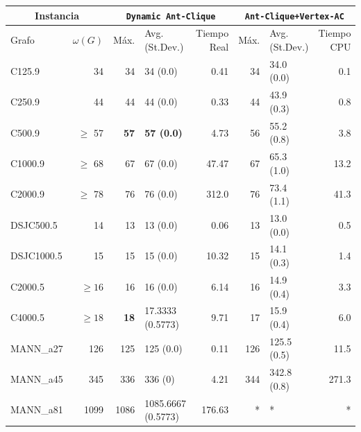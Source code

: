 \documentclass[conference]{IEEEtran}
\begin{document}
\begin{center}
\begin{table}[ht]
{\small
\hfill{}
\begin{tabular}{lr|rlr|rlr}
\hline
\multicolumn{2}{c}{Instancia} &
\multicolumn{3}{|c|}{\texttt{Dynamic Ant-Clique}} &
\multicolumn{3}{c}{\texttt{Ant-Clique+Vertex-AC}}\\
\hline
 Grafo             &  $\omega(G)$  &         Máx.  &  Avg.(St.Dev.)              &  Tiempo Real  &  Máx.  &  Avg.(St.Dev.)  &  Tiempo CPU  \\
\hline
 C125.9            &           34  &           34  &  34 (0.0)                   &         0.41  &    34  &  34.0 (0.0)     &         0.1  \\
 C250.9            &           44  &           44  &  44 (0.0)                   &         0.33  &    44  &  43.9 (0.3)     &         0.8  \\
 C500.9            &    $\geq$ 57  &  \textbf{57}  &  \textbf{57 (0.0)}          &         4.73  &    56  &  55.2 (0.8)     &         3.8  \\
 C1000.9           &    $\geq$ 68  &           67  &  67 (0.0)                   &        47.47  &    67  &  65.3 (1.0)     &        13.2  \\
 C2000.9           &    $\geq$ 78  &           76  &  76 (0.0)                   &        312.0  &    76  &  73.4 (1.1)     &        41.3  \\
 DSJC500.5         &           14  &           13  &  13 (0.0)                   &         0.06  &    13  &  13.0 (0.0)     &         0.5  \\
 DSJC1000.5        &           15  &           15  &  15 (0.0)                   &        10.32  &    15  &  14.1 (0.3)     &         1.4  \\
 C2000.5           &    $\geq 16$  &           16  &  16 (0.0)                   &         6.14  &    16  &  14.9 (0.4)     &         3.3  \\
 C4000.5           &    $\geq 18$  &  \textbf{18}  &  17.3333 (0.5773)           &         9.71  &    17  &  15.9 (0.4)     &         6.0  \\
 MANN\_a27         &          126  &          125  &  125 (0.0)                  &         0.11  &   126  &  125.5 (0.5)    &        11.5  \\
 MANN\_a45         &          345  &          336  &  336 (0)                    &         4.21  &   344  &  342.8 (0.8)    &       271.3  \\
 MANN\_a81         &         1099  &         1086  &  1085.6667 (0.5773)         &       176.63  &     *  &  *              &           *  \\

\end{tabular}}
\end{table}
\end{center}
\end{document}
